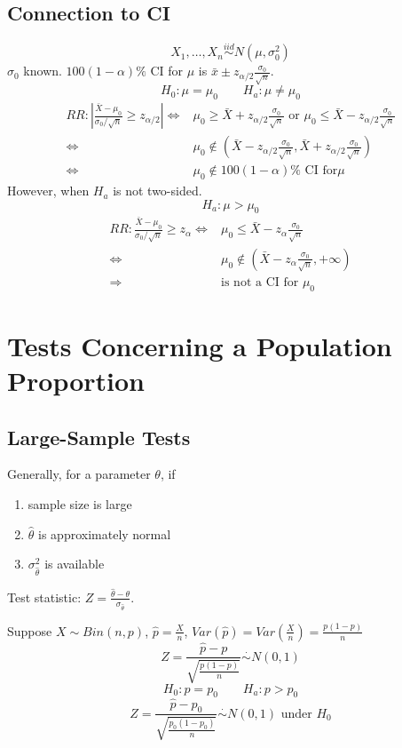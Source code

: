 \subsection{Connection to CI}
\[X_1,\dots,X_n \overset{iid}{\sim} N(\mu,\sigma_0^2)\]
$\sigma_0$ known. $100(1-\alpha)\%$ CI for $\mu$ is $\bar{x} \pm  z_{\alpha/2} \frac{\sigma_0}{\sqrt{n}} $.
\[H_0:\mu=\mu_0 \qquad H_a:\mu\neq\mu_0\]
\begin{align*}
RR:\left| \frac{\bar{X}-\mu_0}{\sigma_0/\sqrt{n}}\geq z_{\alpha/2} \right| \Leftrightarrow & \mu_0\geq \bar{X}+ z_{\alpha/2} \frac{\sigma_0}{\sqrt{n}} \text{ or } \mu_0\leq \bar{X}- z_{\alpha/2} \frac{\sigma_0}{\sqrt{n}} \\
\Leftrightarrow & \mu_0 \notin \left(\bar{X}-  z_{\alpha/2} \frac{\sigma_0}{\sqrt{n}},\bar{X}+ z_{\alpha/2} \frac{\sigma_0}{\sqrt{n}}\right) \\
\Leftrightarrow & \mu_0 \notin 100(1-\alpha)\% \text{ CI for} \mu
\end{align*}
However, when $H_a$ is not two-sided.
\[ H_a:\mu>\mu_0\]
\begin{align*}
RR: \frac{\bar{X}-\mu_0}{\sigma_0/\sqrt{n}}\geq z_{\alpha} \Leftrightarrow &  \mu_0\leq \bar{X}- z_{\alpha} \frac{\sigma_0}{\sqrt{n}} \\
\Leftrightarrow &  \mu_0 \notin \left(\bar{X}- z_{\alpha} \frac{\sigma_0}{\sqrt{n}},+\infty \right) \\
\Rightarrow & \text{is not a CI for }\mu_0 
\end{align*}

\section{Tests Concerning a Population Proportion}
\subsection{Large-Sample Tests}

Generally, for a parameter $\theta$, if
\begin{enumerate}
\item sample size is large
\item $\hat{\theta}$ is approximately normal
\item $\sigma_{\hat{\theta}}^2$ is available
\end{enumerate}

Test statistic: $Z=\frac{\hat{\theta}-\theta}{\sigma_{\hat{\theta}}}$.

Suppose $X\sim Bin(n,p)$, $\hat{p}=\frac{X}{n}$, $Var(\hat{p})=Var\left(\frac{X}{n}\right)=\frac{p(1-p)}{n}$
\[Z=\frac{\hat{p}-p}{\sqrt{\frac{p(1-p)}{n}}} \overset{\cdot}{\sim}N(0,1)\]
\[H_0:p=p_0 \qquad H_a:p>p_0\]
\[Z=\frac{\hat{p}-p_0}{\sqrt{\frac{p_0(1-p_0)}{n}}} \overset{\cdot}{\sim}N(0,1) \text{ under }H_0\]

